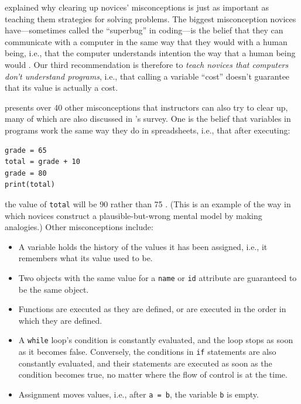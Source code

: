 
 explained why clearing up novices' misconceptions
is just as important as teaching them strategies for solving problems.
The biggest misconception novices have---sometimes called the ``superbug''
in coding---is the belief that they can communicate with a computer in the
same way that they would with a human being, i.e., that the computer
understands intention the way that a human being would
\cite{Pea1986}. Our third recommendation is therefore to \emph{teach
novices that computers don't understand programs}, i.e., that calling a
variable ``cost'' doesn't guarantee that its value is actually a cost.

\cite{Sorv2018} presents over 40 other misconceptions that
instructors can also try to clear up, many of which are also discussed
in \cite{Qian2017}'s survey. One is the belief that variables in
programs work the same way they do in spreadsheets, i.e., that after
executing:

\begin{verbatim}
grade = 65
total = grade + 10
grade = 80
print(total)
\end{verbatim}

the value of \texttt{total} will be 90 rather than 75 \cite{Kohn2017}.
(This is an example of the way in which novices construct a
plausible-but-wrong mental model by making analogies.) Other
misconceptions include:

\begin{itemize}
\item
  A variable holds the history of the values it has been assigned,
  i.e., it remembers what its value used to be.
\item
  Two objects with the same value for a \texttt{name} or \texttt{id} attribute are
  guaranteed to be the same object.
\item
  Functions are executed as they are defined, or are executed in the
  order in which they are defined.
\item
  A \texttt{while} loop's condition is constantly evaluated, and the loop
  stops as soon as it becomes false. Conversely, the conditions in
  \texttt{if} statements are also constantly evaluated, and their statements
  are executed as soon as the condition becomes true, no matter where
  the flow of control is at the time.
\item
  Assignment moves values, i.e., after \texttt{a\ =\ b}, the variable \texttt{b} is
  empty.
\end{itemize}

